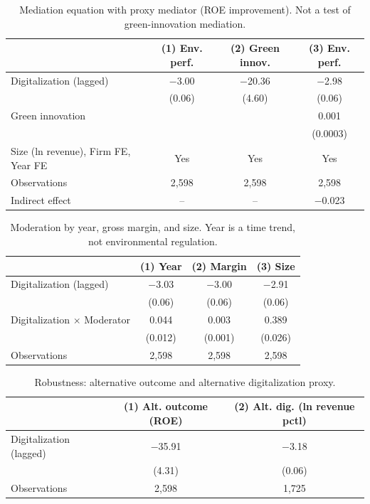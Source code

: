 \documentclass[3p,times,sort&compress]{elsarticle}
\begin{document}
\begin{table}[htbp]
  \centering
  \caption{Mediation equation with proxy mediator (ROE improvement). Not a test of green-innovation mediation.}
  \label{tab:mediation}
  \small
  \begin{tabularx}{\textwidth}{@{}>{\raggedright\arraybackslash}X c c c@{}}
    \toprule
    & (1) Env. perf. & (2) Green innov. & (3) Env. perf. \\
    \midrule
    Digitalization (lagged) & $-$3.00 & $-$20.36 & $-$2.98 \\
    & (0.06) & (4.60) & (0.06) \\
    Green innovation & & & 0.001 \\
    & & & (0.0003) \\
    Size (ln revenue), Firm FE, Year FE & Yes & Yes & Yes \\
    \midrule
    Observations & 2,598 & 2,598 & 2,598 \\
    Indirect effect & -- & -- & $-$0.023 \\
    \bottomrule
  \end{tabularx}
\end{table}

\begin{table}[htbp]
  \centering
  \caption{Moderation by year, gross margin, and size. Year is a time trend, not environmental regulation.}
  \label{tab:moderation}
  \small
  \begin{tabularx}{\textwidth}{@{}>{\raggedright\arraybackslash}X c c c@{}}
    \toprule
    & (1) Year & (2) Margin & (3) Size \\
    \midrule
    Digitalization (lagged) & $-$3.03 & $-$3.00 & $-$2.91 \\
    & (0.06) & (0.06) & (0.06) \\
    Digitalization $\times$ Moderator & 0.044 & 0.003 & 0.389 \\
    & (0.012) & (0.001) & (0.026) \\
    \midrule
    Observations & 2,598 & 2,598 & 2,598 \\
    \bottomrule
  \end{tabularx}
\end{table}

\begin{table}[htbp]
  \centering
  \caption{Robustness: alternative outcome and alternative digitalization proxy.}
  \label{tab:robustness}
  \small
  \begin{tabularx}{\textwidth}{@{}>{\raggedright\arraybackslash}X c c@{}}
    \toprule
    & (1) Alt. outcome (ROE) & (2) Alt. dig. (ln revenue pctl) \\
    \midrule
    Digitalization (lagged) & $-$35.91 & $-$3.18 \\
    & (4.31) & (0.06) \\
    \midrule
    Observations & 2,598 & 1,725 \\
    \bottomrule
  \end{tabularx}
\end{table}
\end{document}
